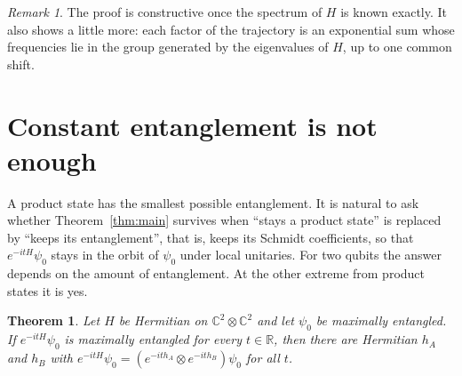 \documentclass[11pt]{article}
\newtheorem{theorem}{Theorem}
\theoremstyle{remark}
\newtheorem*{remark}{Remark}
\newcommand{\C}{\mathbb{C}}
\newcommand{\R}{\mathbb{R}}
\begin{document}
\begin{remark}
The proof is constructive once the spectrum of $H$ is known exactly. It also shows a little
more: each factor of the trajectory is an exponential sum whose frequencies lie in the group
generated by the eigenvalues of $H$, up to one common shift.
\end{remark}

\section{Constant entanglement is not enough}\label{sec:sharp}

A product state has the smallest possible entanglement. It is natural to ask whether
Theorem~\ref{thm:main} survives when ``stays a product state'' is replaced by ``keeps its
entanglement'', that is, keeps its Schmidt coefficients, so that $e^{-itH}\psi_0$ stays in the
orbit of $\psi_0$ under local unitaries. For two qubits the answer depends on the amount of
entanglement. At the other extreme from product states it is yes.

\begin{theorem}\label{thm:maxent}
Let $H$ be Hermitian on $\C^2\otimes\C^2$ and let $\psi_0$ be maximally entangled. If
$e^{-itH}\psi_0$ is maximally entangled for every $t\in\R$, then there are Hermitian $h_A$ and
$h_B$ with $e^{-itH}\psi_0=(e^{-ith_A}\otimes e^{-ith_B})\psi_0$ for all $t$.
\end{theorem}
\end{document}
